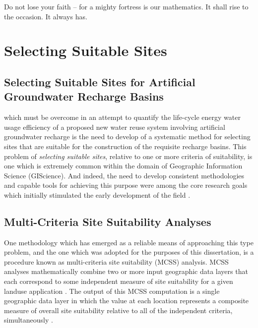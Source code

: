 \begin{savequote}[75mm]
Do not lose your faith -- for a mighty fortress is our mathematics. It shall rise to the occasion. It always has. 
\end{savequote}

\chapter{Selecting Suitable Sites}
\label{chapter 1}

\newpage
 
\section{Selecting Suitable Sites for Artificial Groundwater Recharge Basins}

 which must be overcome in an attempt to quantify the life-cycle energy water usage efficiency of a proposed new water reuse system involving artificial groundwater recharge is the need to develop of a systematic method for selecting sites that are suitable for the construction of the requisite recharge basins. This problem of \textit{selecting suitable sites}, relative to one or more criteria of suitability, is one which is extremely common within the domain of Geographic Information Science (GIScience). And indeed, the need to develop consistent methodologies and capable tools for achieving this purpose were among the core research goals which initially stimulated the early development of the field \cite{Tomlin1979,Tomlin1994,Malczewski1999}.
 
\section{Multi-Criteria Site Suitability Analyses}

One methodology which has emerged as a reliable means of approaching this type problem, and the one which was adopted for the purposes of this dissertation, is a procedure known as multi-criteria site suitability (MCSS) analysis. MCSS analyses mathematically combine two or more input geographic data layers that each correspond to some independent measure of site suitability for a given landuse application \cite{Bolstad2005}. The output of this MCSS computation is a single geographic data layer in which the value at each location represents a composite measure of overall site suitability relative to all of the independent criteria, simultaneously \cite{Hopkins1977, Collins2001}.  

